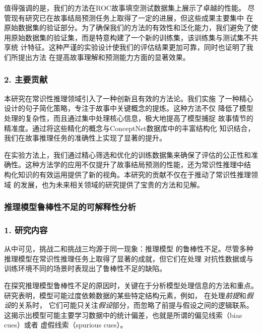 值得强调的是，我们的方法在ROC故事填空测试数据集上展示了卓越的性能。
尽管现有研究已在故事结局预测任务上取得了一定的进展，但这些成果主要集中
在原始数据集的验证部分。为了确保我们的方法的有效性和泛化能力，我们避免了使
用原始数据集的验证集，而是特意构建了一个新的训练集，该训练集与测试集不共享统
计特征。这种严谨的实验设计使我们的评估结果更加可靠，同时也证明了我们所提出方法
在提高故事理解和预测能力方面的显著效果。

\subsubsection*{2. 主要贡献}

本研究在常识性推理领域引入了一种创新且有效的方法论。我们实施
了一种精心设计的句子简化策略，专注于故事中关键概念的提炼。这种方法不仅
降低了模型处理的复杂性，而且通过集中处理核心信息，极大地提高了模型捕捉
故事情节的精准度。通过将这些精化的概念与ConceptNet数据库中的丰富结构化
知识结合，我们在故事推理任务的准确性上实现了显著的提升。

在实验方法上，我们通过精心筛选和优化的训练数据集来确保了评估的公正性和准
确性。这种方法学的应用不仅提升了故事结局预测的性能，还为常识性推理中结
构化知识的有效运用提供了新的视角。本研究的贡献不仅在于推动了常识性推理领域
的发展，也为未来相关领域的研究提供了宝贵的方法和见解。

\subsubsection{推理模型鲁棒性不足的可解释性分析}
\subsubsection*{1. 研究内容}

从中可见，挑战二和挑战三均源于同一现象：推理模型
的鲁棒性不足。尽管多种推理模型在常识性推理任务上取得了显著的成就，但它们在处理
对抗性数据或与训练环境不同的场景时表现出了鲁棒性不足的缺陷。

在探究推理模型鲁棒性不足的原因时，关键在于分析模型处理信息的方法和重点。
研究表明，模型可能过度依赖数据的某些特定结构元素，例如，
在处理\textit{前提}和\textit{假设}的关系时，
它们可能只关注\textit{假设}部分，而忽略了前提与假设之间的逻辑联系\cite{naik2018stress,mccoy2019right,schuster2019towards,nie2020adversarial}。
这揭示出模型可能主要学习数据中的统计偏差，也就是所谓的偏见线索（bias cues）或者
虚假线索（spurious cues）。

